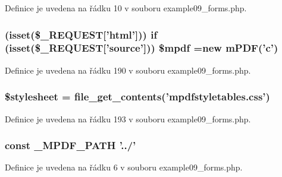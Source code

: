 Definice je uvedena na řádku 10 v souboru example09\-\_\-forms.\-php.

\hypertarget{example09__forms_8php_a81626621a7353594653854d6441ac65c}{
\subsubsection[{\$mpdf}]{ (isset(\$\-\_\-\-R\-E\-Q\-U\-E\-S\-T\mbox{[}'html'\mbox{]})) {\bf if} (isset(\$\-\_\-\-R\-E\-Q\-U\-E\-S\-T\mbox{[}'source'\mbox{]})) \$mpdf =new {\bf m\-P\-D\-F}('c')}}\label{example09__forms_8php_a81626621a7353594653854d6441ac65c}


Definice je uvedena na řádku 190 v souboru example09\-\_\-forms.\-php.

\hypertarget{example09__forms_8php_a19e5cf73e817c55a49205e6ec78c88a8}{
\subsubsection[{\$stylesheet}]{\setlength{\rightskip}{0pt plus 5cm}\$stylesheet = file\-\_\-get\-\_\-contents('mpdfstyletables.\-css')}}\label{example09__forms_8php_a19e5cf73e817c55a49205e6ec78c88a8}


Definice je uvedena na řádku 193 v souboru example09\-\_\-forms.\-php.

\hypertarget{example09__forms_8php_a79734099b3f1817b14687db06cde3132}{
\subsubsection[{\-\_\-\-M\-P\-D\-F\-\_\-\-P\-A\-T\-H}]{\setlength{\rightskip}{0pt plus 5cm}const \-\_\-\-M\-P\-D\-F\-\_\-\-P\-A\-T\-H '../'}}\label{example09__forms_8php_a79734099b3f1817b14687db06cde3132}


Definice je uvedena na řádku 6 v souboru example09\-\_\-forms.\-php.



